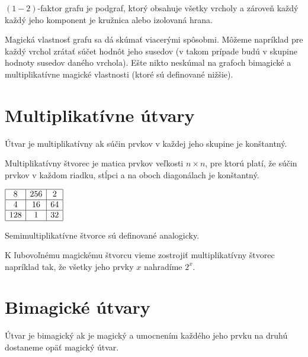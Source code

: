 \begin{note} $(1-2)$-faktor grafu je podgraf, ktorý obsahuje všetky vrcholy a zároveň každý každý jeho komponent je kružnica alebo izolovaná hrana. 
\end{note} 

Magická vlastnosť grafu sa dá skúmať viacerými spôsobmi. Môžeme napríklad pre každý vrchol zrátať súčet hodnôt jeho susedov (v takom prípade budú v skupine hodnoty susedov daného vrchola). Ešte nikto neskúmal na grafoch bimagické a multiplikatívne magické vlastnosti (ktoré sú definované nižšie). \\

\section{Multiplikatívne útvary}
\begin{definition} Útvar je multiplikatívny ak súčin prvkov v každej jeho skupine je konštantný.
\end{definition}

\begin{definition} Multiplikatívny štvorec je matica prvkov veľkosti $n \times n$, pre ktorú platí, že súčin prvkov v každom riadku, stĺpci a na oboch diagonálach je konštantný.
\end{definition}

\begin{center}
$\begin{array}{ |c|c|c| } 
\hline
8 & 256 & 2 \\ 
\hline
4 & 16 & 64 \\ 
\hline
128 & 1 & 32 \\
\hline
\end{array}$
\end{center}

\begin{note} Semimultiplikatívne štvorce sú definované analogicky.
\end{note}

K ľubovoľnému magickému štvorcu vieme zostrojiť multiplikatívny štvorec napríklad tak, že všetky jeho prvky $x$ nahradíme $2^x$.

\section{Bimagické útvary}
\begin{definition} Útvar je bimagický ak je magický a umocnením každého jeho prvku na druhú dostaneme opäť magický útvar.
\end{definition}

